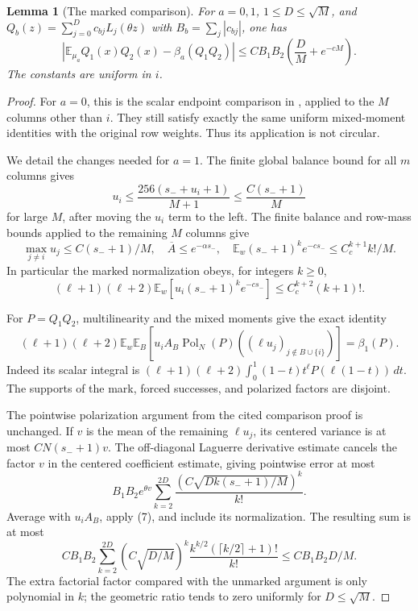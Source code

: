 \documentclass[11pt]{article}
\newtheorem{lemma}{Lemma}
\newcommand{\E}{\mathbb E}
\newcommand{\Pol}{\operatorname{Pol}}
\begin{document}
\begin{lemma}[The marked comparison]\label{marked}
For $a=0,1$, $1\le D\le\sqrt M$, and
$Q_b(z)=\sum_{j=0}^D c_{bj}L_j(\theta z)$ with
$B_b=\sum_j|c_{bj}|$, one has
\[
 \left|\E_{\mu_a}Q_1(x)Q_2(x)-\beta_a(Q_1Q_2)\right|
 \le C B_1B_2\left(\frac D M+e^{-cM}\right).        \tag{4}
\]
The constants are uniform in $i$.
\end{lemma}
\begin{proof}
For $a=0$, this is the scalar endpoint comparison in
, applied to the $M$
columns other than $i$. They still satisfy exactly the same uniform
mixed-moment identities with the original row weights. Thus its
application is not circular.

We detail the changes needed for $a=1$. The finite global balance
bound for all $m$ columns gives
\[
 u_i\le\frac{256(s_-+u_i+1)}{M+1}
       \le\frac{C(s_-+1)}M                         \tag{5}
\]
for large $M$, after moving the $u_i$ term to the left.
The finite balance and row-mass bounds applied to the remaining $M$
columns give
\[
 \max_{j\ne i}u_j\le C(s_-+1)/M,\quad
 \overline A\le e^{-\alpha s_-},\quad
 \E_w(s_-+1)^k e^{-c s_-}\le C_c^{k+1}k!/M.        \tag{6}
\]
In particular the marked normalization obeys, for integers $k\ge0$,
\[
 (\ell+1)(\ell+2)\E_w[u_i(s_-+1)^k e^{-c s_-}]
       \le C_c^{k+2}(k+1)!.                       \tag{7}
\]

For $P=Q_1Q_2$, multilinearity and the mixed moments give the exact
identity
\[
 (\ell+1)(\ell+2)\E_w\E_B
 [u_i A_B\Pol_N(P)((\ell u_j)_{j\notin B\cup\{i\}})]
       =\beta_1(P).                              \tag{8}
\]
Indeed its scalar integral is
$(\ell+1)(\ell+2)\int_0^1(1-t)t^\ell P(\ell(1-t))\,dt$.
The supports of the mark, forced successes, and polarized factors
are disjoint.

The pointwise polarization argument from the cited comparison proof
is unchanged. If $v$ is the mean of the remaining $\ell u_j$,
its centered variance is at most $CN(s_-+1)v$. The off-diagonal
Laguerre derivative estimate cancels the factor $v$ in the centered
coefficient estimate, giving pointwise error at most
\[
 B_1B_2e^{\theta v}
  \sum_{k=2}^{2D}\frac{(C\sqrt{Dk(s_-+1)/M})^k}{k!}.
\]
Average with $u_i A_B$, apply (7), and include its normalization.
The resulting sum is at most
\[
 C B_1B_2\sum_{k=2}^{2D}
 (C\sqrt{D/M})^k
 \frac{k^{k/2}(\lceil k/2\rceil+1)!}{k!}
 \le C B_1B_2 D/M.                               \tag{9}
\]
The extra factorial factor compared with the unmarked argument is
only polynomial in $k$; the geometric ratio tends to zero uniformly
for $D\le\sqrt M$.


\end{proof}
\end{document}
